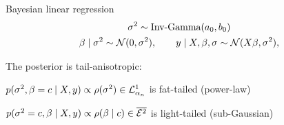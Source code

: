 \begin{subframe}{Bayesian linear regression}
\vspace{-10mm}
    \begin{gather*}
        \sigma^2 \sim \text{Inv-Gamma}(a_0, b_0)\\
        \beta \mid \sigma^2 \sim \mathcal{N}(0, \sigma^2),\qquad
        y \mid X, \beta, \sigma \sim \mathcal{N}(X \beta, \sigma^2) ,
    \end{gather*}
    
    The posterior is tail-anisotropic: 
    
    $p(\sigma^2, \beta=c \mid X, y) \propto \rho(\sigma^2) \in \mathcal{L}^1_{\alpha_n}$ is fat-tailed (power-law)
    
    $p(\sigma^2=c, \beta \mid X, y) \propto \rho(\beta \mid c) \in \overline{\mathcal{E}^2}$ is light-tailed (sub-Gaussian)

\end{subframe}

